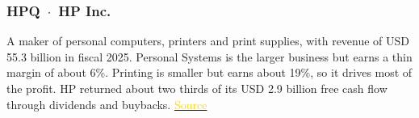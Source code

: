 \documentclass[10pt,a4paper]{article}
\begin{document}
\subsubsection*{HPQ \,$\cdot$\, HP Inc.}
A maker of personal computers, printers and print supplies, with revenue of USD 55.3 billion in fiscal 2025. Personal Systems is the larger business but earns a thin margin of about 6\%. Printing is smaller but earns about 19\%, so it drives most of the profit. HP returned about two thirds of its USD 2.9 billion free cash flow through dividends and buybacks.
\href{https://www.hp.com/us-en/newsroom/press-releases/2025/hp-inc-reports-fiscal-2025-full-year-and-fourth-quarter-results.html}{\textcolor{gold}{Source}}

\endgroup
\end{document}
